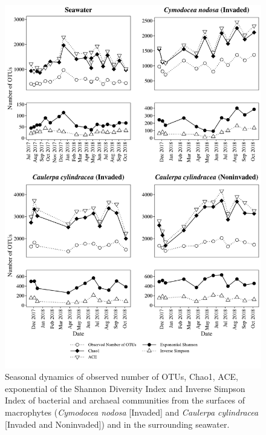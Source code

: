 \documentclass[12pt,]{article}
\begin{document}
\begin{figure}[H]

{\centering \includegraphics[width=0.85\linewidth]{../results/figures/calculators} 

}

\caption{Seasonal dynamics of observed number of OTUs, Chao1, ACE, exponential of the Shannon Diversity Index and Inverse Simpson Index of bacterial and archaeal communities from the surfaces of macrophytes (\textit{Cymodocea nodosa} [Invaded] and \textit{Caulerpa cylindracea} [Invaded and Noninvaded]) and in the surrounding seawater.\label{calculators}}\label{fig:unnamed-chunk-2}
\end{figure}
\end{document}
